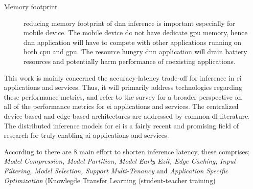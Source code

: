 \begin{description}
	\item[Memory footprint] reducing memory footprint of \gls{dnn} inference is important especially for mobile device. The mobile device do not have dedicate \gls{gpu} memory, hence \gls{dnn} application will have to compete with other applications running on both \gls{cpu} and \gls{gpu}. The resource hungry \gls{dnn} application will drain battery resources and potentially harm performance of coexisting applications.   
\end{description}

This work is mainly concerned the accuracy-latency trade-off for inference in \gls{ei} applications and services. Thus, it will primarily address technologies regarding these performance metrics, and refer to the survey for a broader perspective on all of the performance metrics for \gls{ei} applications and services. The centralized device-based and edge-based architectures are addressed by common \gls{dl} literature. The distributed inference models for \gls{ei} is a fairly recent and promising field of research for truly enabling \gls{ai} applications and services.

According to \cite{zhou_edge_2019} there are 8 main effort to shorten inference latency, these comprises; \textit{Model Compression, Model Partition, Model Early Exit, Edge Caching, Input Filtering, Model Selection, Support Multi-Tenancy} and \textit{Application Specific Optimization} (Knowlegde Transfer Learning (student-teacher training)



